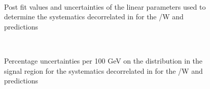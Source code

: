 \begin{figure}[h!]
  \centering
  ~~
  \\
  \caption{\label{fig:postFitPerHt} 
  Post fit values and uncertainties of the linear parameters used to determine the systematics decorrelated in \scalht for 
  the \ttbar/W and \zInv~ predictions}
\end{figure}
\begin{figure}[h!]
  \centering
  ~~
  \\
  \caption{\label{fig:uncPerNJet} 
     Percentage uncertainties per 100 GeV on the \mht distribution in the signal region for the systematics decorrelated in \njet
    for the \ttbar/W and \zInv~ predictions}
\end{figure}
